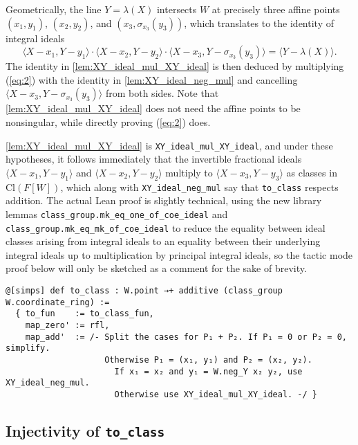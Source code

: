 \documentclass[a4paper,UKenglish,cleveref,autoref,thm-restate]{lipics-v2021}
\begin{document}
\begin{remark}
Geometrically, the line $ Y = \lambda(X) $ intersects $ W $ at precisely three affine points $ (x_1, y_1) $, $ (x_2, y_2) $, and $ (x_3, \sigma_{x_3}(y_3)) $, which translates to the identity of integral ideals
\begin{equation}
\label{eq:2}
\langle X - x_1, Y - y_1 \rangle \cdot \langle X - x_2, Y - y_2 \rangle \cdot \langle X - x_3, Y - \sigma_{x_3}(y_3) \rangle = \langle Y - \lambda(X) \rangle.
\end{equation}
The identity in \cref{lem:XY_ideal_mul_XY_ideal} is then deduced by multiplying (\ref{eq:2}) with the identity in \cref{lem:XY_ideal_neg_mul} and cancelling $ \langle X - x_3, Y - \sigma_{x_3}(y_3) \rangle $ from both sides. Note that \cref{lem:XY_ideal_mul_XY_ideal} does not need the affine points to be nonsingular, while directly proving (\ref{eq:2}) does.
\end{remark}

\cref{lem:XY_ideal_mul_XY_ideal} is \texttt{XY\_ideal\_mul\_XY\_ideal}, and under these hypotheses, it follows immediately that the invertible fractional ideals $ \langle X - x_1, Y - y_1 \rangle $ and $ \langle X - x_2, Y - y_2 \rangle $ multiply to $ \langle X - x_3, Y - y_3 \rangle $ as classes in $ \mathrm{Cl}(F[W]) $, which along with \texttt{XY\_ideal\_neg\_mul} say that \texttt{to\_class} respects addition. The actual Lean proof is slightly technical, using the new library lemmas \texttt{class\_group.mk\_eq\_one\_of\_coe\_ideal} and \texttt{class\_group.mk\_eq\_mk\_of\_coe\_ideal} to reduce the equality between ideal classes arising from integral ideals to an equality between their underlying integral ideals up to multiplication by principal integral ideals, so the tactic mode proof below will only be sketched as a comment for the sake of brevity.
\begin{lstlisting}
@[simps] def to_class : W.point →+ additive (class_group W.coordinate_ring) :=
  { to_fun    := to_class_fun,
    map_zero' := rfl,
    map_add'  := /- Split the cases for P₁ + P₂. If P₁ = 0 or P₂ = 0, simplify.
                    Otherwise P₁ = (x₁, y₁) and P₂ = (x₂, y₂).
                      If x₁ = x₂ and y₁ = W.neg_Y x₂ y₂, use XY_ideal_neg_mul.
                      Otherwise use XY_ideal_mul_XY_ideal. -/ }
\end{lstlisting}

\pagebreak

\subsection{Injectivity of \texttt{to\_class}}
\end{document}
